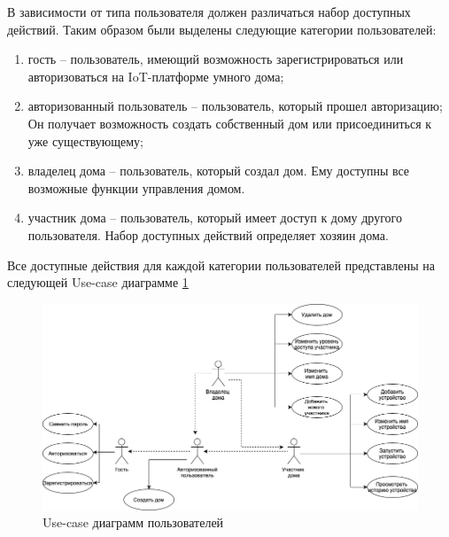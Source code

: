 В зависимости от типа пользователя должен различаться набор доступных действий. Таким 
образом были выделены следующие категории пользователей:

\begin{enumerate}
    \item гость -- пользователь, имеющий возможность 
    зарегистрироваться или авторизоваться на IoT-платформе умного дома;
    \item авторизованный пользователь -- пользователь, который прошел авторизацию;
    Он получает возможность создать собственный дом или присоединиться к уже существующему;
    \item владелец дома -- пользователь, который создал дом. Ему доступны все возможные функции управления домом.
    \item участник дома -- пользователь, который имеет доступ к дому другого пользователя.
    Набор доступных действий определяет хозяин дома.
\end{enumerate}

Все доступные действия для каждой категории пользователей представлены на следующей Use-case диаграмме \ref{img:iot}
\begin{figure}[h]
    \includegraphics[width=0.9\linewidth]{img/ucd.png}
    \caption{Use-case диаграмм пользователей}
    \label{img:iot}
\end{figure}
\clearpage

